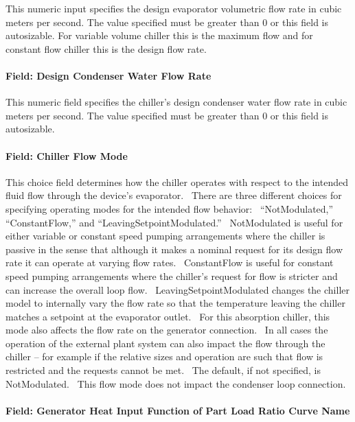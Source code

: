 This numeric input specifies the design evaporator volumetric flow rate in cubic meters per second. The value specified must be greater than 0 or this field is autosizable. For variable volume chiller this is the maximum flow and for constant flow chiller this is the design flow rate.

\paragraph{Field: Design Condenser Water Flow Rate}\label{field-design-condenser-water-flow-rate-1}

This numeric field specifies the chiller's design condenser water flow rate in cubic meters per second. The value specified must be greater than 0 or this field is autosizable.

\paragraph{Field: Chiller Flow Mode}\label{field-chiller-flow-mode-1}

This choice field determines how the chiller operates with respect to the intended fluid flow through the device's evaporator.~ There are three different choices for specifying operating modes for the intended flow behavior:~ ``NotModulated,'' ``ConstantFlow,'' and ``LeavingSetpointModulated.''~ NotModulated is useful for either variable or constant speed pumping arrangements where the chiller is passive in the sense that although it makes a nominal request for its design flow rate it can operate at varying flow rates.~ ConstantFlow is useful for constant speed pumping arrangements where the chiller's request for flow is stricter and can increase the overall loop flow.~ LeavingSetpointModulated changes the chiller model to internally vary the flow rate so that the temperature leaving the chiller matches a setpoint at the evaporator outlet.~ For this absorption chiller, this mode also affects the flow rate on the generator connection.~ In all cases the operation of the external plant system can also impact the flow through the chiller -- for example if the relative sizes and operation are such that flow is restricted and the requests cannot be met.~ The default, if not specified, is NotModulated.~ This flow mode does not impact the condenser loop connection.

\paragraph{Field: Generator Heat Input Function of Part Load Ratio Curve Name}\label{field-generator-heat-input-function-of-part-load-ratio-curve-name}

